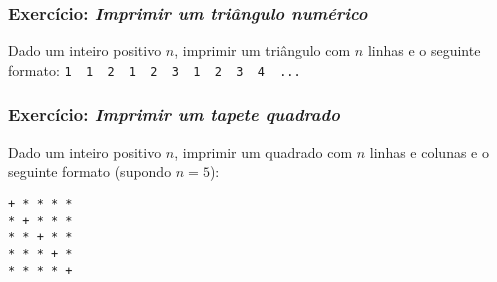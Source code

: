 \documentclass[11pt]{article}
\begin{document}
    \subsubsection{\texorpdfstring{Exercício: \emph{Imprimir um triângulo
numérico}}{Exercício: Imprimir um triângulo numérico}}\label{exercuxedcio-imprimir-um-triuxe2ngulo-numuxe9rico}

Dado um inteiro positivo \(n\), imprimir um triângulo com \(n\) linhas e
o seguinte formato:
\texttt{1\ \ 1\ \ 2\ \ 1\ \ 2\ \ 3\ \ 1\ \ 2\ \ 3\ \ 4\ \ ...}

    \subsubsection{\texorpdfstring{Exercício: \emph{Imprimir um tapete
quadrado}}{Exercício: Imprimir um tapete quadrado}}\label{exercuxedcio-imprimir-um-tapete-quadrado}

Dado um inteiro positivo \(n\), imprimir um quadrado com \(n\) linhas e
colunas e o seguinte formato (supondo \(n = 5\)):

\begin{verbatim}
+ * * * *
* + * * *
* * + * *
* * * + *
* * * * +
\end{verbatim}


    
    
    
    
\end{document}
